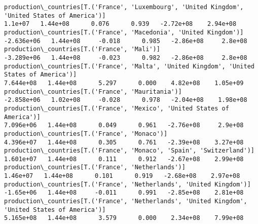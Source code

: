 \documentclass[11pt]{article}
\begin{document}
\begin{Verbatim}[commandchars=\\\{\}]
production\_countries[T.('France', 'Luxembourg', 'United Kingdom', 'United States of America')]                                                                                           1.1e+07   1.44e+08      0.076      0.939   -2.72e+08    2.94e+08
production\_countries[T.('France', 'Macedonia', 'United Kingdom')]                                                                                                                     -2.636e+06   1.44e+08     -0.018      0.985   -2.86e+08     2.8e+08
production\_countries[T.('France', 'Mali')]                                                                                                                                            -3.289e+06   1.44e+08     -0.023      0.982   -2.86e+08     2.8e+08
production\_countries[T.('France', 'Malta', 'United Kingdom', 'United States of America')]                                                                                              7.644e+08   1.44e+08      5.297      0.000    4.82e+08    1.05e+09
production\_countries[T.('France', 'Mauritania')]                                                                                                                                      -2.858e+06   1.02e+08     -0.028      0.978   -2.04e+08    1.98e+08
production\_countries[T.('France', 'Mexico', 'United States of America')]                                                                                                               7.096e+06   1.44e+08      0.049      0.961   -2.76e+08     2.9e+08
production\_countries[T.('France', 'Monaco')]                                                                                                                                           4.396e+07   1.44e+08      0.305      0.761   -2.39e+08    3.27e+08
production\_countries[T.('France', 'Monaco', 'Spain', 'Switzerland')]                                                                                                                   1.601e+07   1.44e+08      0.111      0.912   -2.67e+08    2.99e+08
production\_countries[T.('France', 'Netherlands')]                                                                                                                                       1.46e+07   1.44e+08      0.101      0.919   -2.68e+08    2.97e+08
production\_countries[T.('France', 'Netherlands', 'United Kingdom')]                                                                                                                    -1.65e+06   1.44e+08     -0.011      0.991   -2.85e+08    2.81e+08
production\_countries[T.('France', 'Netherlands', 'United Kingdom', 'United States of America')]                                                                                        5.165e+08   1.44e+08      3.579      0.000    2.34e+08    7.99e+08

\end{Verbatim}
\end{document}
